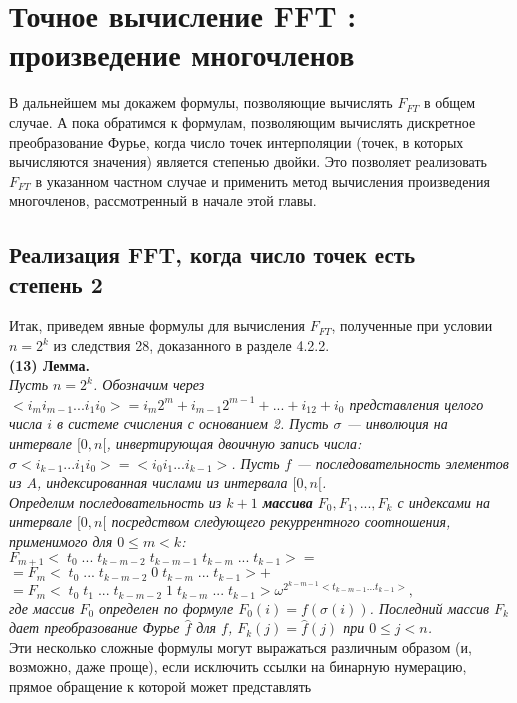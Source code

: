 \documentclass{mai_book}
\begin{document}
\chapter{ Точное вычисление FFT :\\ произведение
многочленов}
В дальнейшем мы докажем формулы, позволяющие вычислять $F_{FT}$ в
общем случае. А пока обратимся к формулам, позволяющим вычислять
дискретное преобразование Фурье, когда число точек интерполяции
(точек, в которых вычисляются значения) является степенью двойки.
Это позволяет реализовать $F_{FT}$ в указанном частном случае и 
применить метод вычисления произведения многочленов, рассмотренный в
начале этой главы.
\section{ Реализация FFT, когда число точек
есть\\ степень 2}
Итак, приведем явные формулы для вычисления $F_{FT}$, полученные при
условии $n=2^k$ из следствия 28, доказанного в разделе 4.2.2.\smallskip\\
\textbf{(13) Лемма.}\smallskip\\
\textit{Пусть $n=2^k$. Обозначим через $<i_mi_{m-1}...i_1i_0>=i_m2^m+i_{m-1}2^{m-1}+...+i_12+i_0$ представления целого числа $i$ в системе счисления с 
основанием 2. Пусть $\sigma$ — инволюция на интервале $[0, n[$, инвертирующая
двоичную запись числа:\\ $\sigma<i_{k-1}...i_1i_0>=<i_0i_1...i_{k-1}>$. Пусть $f$ — 
последовательность элементов из $A$, индексированная числами из 
интервала $[0,n[$.\\
Определим последовательность из $k +1$ \textbf{массива} $F_0, F_1,..., F_k $ с 
индексами на интервале $[0, n[$ посредством следующего рекуррентного 
соотношения, применимого для $0 \leq m <k$:\\
$F_{m+1}<\;t_0\;...\;t_{k-m-2}\;t_{k-m-1}\;t_{k-m}\;...\;t_{k-1}>=$\\
$=F_m<\;t_0\;...\;t_{k-m-2}\;0\;t_{k-m}\;...\;t_{k-1}>+$\\
$=F_m<\;t_0\;t_1\;...\;t_{k-m-2}\;1\;t_{k-m}\;...\;t_{k-1}> \omega^{2^{k-m-1}<t_{k-m-1}...t_{k-1}>},$\\
где массив $F_0$ определен по формуле $F_0(i)=f(\sigma(i))$. Последний массив
$F_k$ дает преобразование Фурье $\hat{f}$ для $f$, $F_k(j) = \hat{f}(j)$ при $0 \leq j < n$.}\\
Эти несколько сложные формулы могут выражаться различным
образом (и, возможно, даже проще), если исключить ссылки на 
бинарную нумерацию, прямое обращение к которой может представлять
\end{document}
